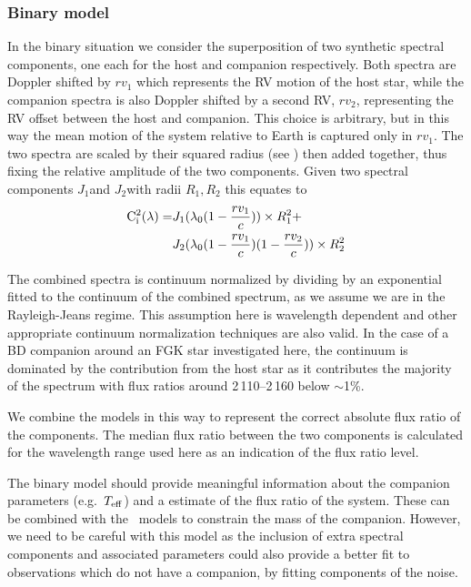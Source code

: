 \subsubsection{Binary model}
\label{subsubsec:binary-model}
In the binary situation we consider the superposition of two synthetic spectral components, one each for the host and companion respectively. Both spectra are Doppler shifted by \({rv}_1\) which represents the {RV} motion of the host star, while the companion spectra is also Doppler shifted by a second {RV}, \({rv}_2\), representing the {RV} offset between the host and companion. This choice is arbitrary, but in this way the mean motion of the system relative to Earth is captured only in \({rv}_1\). The two spectra are scaled by their squared radius (see ) then added together, thus fixing the relative amplitude of the two components.
Given two spectral components \(J_{1}\)and \(J_{2}\)with radii \(R_1, R_2\) this equates to
\begin{align}
\rm C^{2}_{i}(\lambda) = &  J_{1}(\lambda_{0}(1 - \frac{rv_{1}}{c}))\times R_{1}^2 +\nonumber \\
& J_{2}(\lambda_{0}(1-\frac{rv_{1}}{c})(1-\frac{rv_{2}}{c}))\times R_{2}^2
\end{align}


The combined spectra is continuum normalized by dividing by an exponential fitted to the continuum of the combined spectrum, as we assume we are in the Rayleigh-Jeans regime. This assumption here is wavelength dependent and other appropriate continuum normalization techniques are also valid. In the case of a {BD} companion around an FGK star investigated here, the continuum is dominated by the contribution from the host star as it contributes the majority of the spectrum with flux ratios around 2\,110--2\,160\nm{} below \(\sim\)1\%.

We combine the models in this way to represent the correct absolute flux ratio of the components. The median flux ratio between the two components is calculated for the wavelength range used here as an indication of the flux ratio level.

The binary model should provide meaningful information about the companion parameters (e.g.\ \(T_{\mathrm{eff}}{}\)) and a estimate of the flux ratio of the system. These can be combined with the~\citet{baraffe_evolutionary_2003} models to constrain the mass of the companion. However, we need to be careful with this model as the inclusion of extra spectral components and associated parameters could also provide a better fit to observations which do not have a companion, by fitting components of the noise.\\

